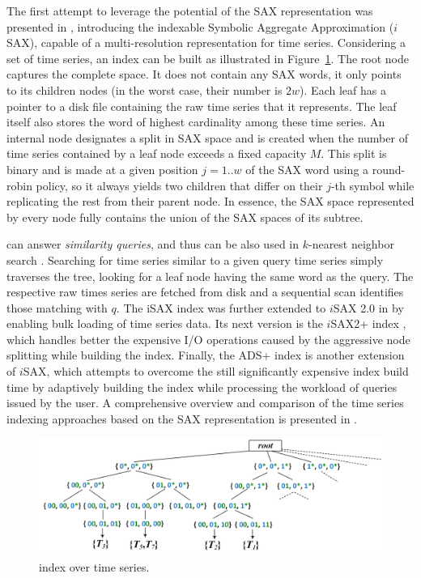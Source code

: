 The first attempt to leverage the potential of the SAX representation was presented in \cite{shieh2008kdd}, introducing the indexable Symbolic Aggregate Approximation ($i$SAX), capable of a multi-resolution representation for time series. Considering a set of time series, an \isax index \cite{shieh2008kdd} can be built as illustrated in Figure~\ref{fig:isaxtree}. The root node captures the complete \isax space. It does not contain any SAX words, it only points to its children nodes (in the worst case, their number is $2w$). Each leaf has a pointer to a disk file containing the raw time series that it represents. The leaf itself also stores the \isax word of highest cardinality among these time series. An internal node designates a split in SAX space and is created when the number of time series contained by a leaf node exceeds a fixed capacity $M$. This split is binary and is made at a given position $j=1..w$ of the SAX word using a round-robin policy, so it always yields two children that differ on their $j$-th symbol while replicating the rest from their parent node. In essence, the SAX space represented by every node fully contains the union of the SAX spaces of its subtree.

\isax can answer {\em similarity queries}, and thus can be also used in $k$-nearest neighbor search \cite{shieh2008kdd}. Searching for time series similar to a given query time series simply traverses the \isax tree, looking for a leaf node having the same \isax word as the query. The respective raw times series are fetched from disk and a sequential scan identifies those matching with $q$. The iSAX index was further extended to $i$SAX 2.0 in \cite{camerra2010icdm} by enabling bulk loading of time series data. Its next version is the $i$SAX2+ index \cite{camerra2014kais}, which handles better the expensive I/O operations caused by the aggressive node splitting while building the index. Finally, the ADS+ index \cite{zoumpatianos2014sigmod} is another extension of $i$SAX, which attempts to overcome the still significantly expensive index build time by adaptively building the index while processing the workload of queries issued by the user. A comprehensive overview and comparison of the time series indexing approaches based on the SAX representation is presented in \cite{palpanas2016bigsm}.

\begin{figure}[!t]
 \centering
 \includegraphics[width=\textwidth]{figures/isax_tree2.png}
 \caption{\isax index over time series.}
 \label{fig:isaxtree}
\end{figure}

